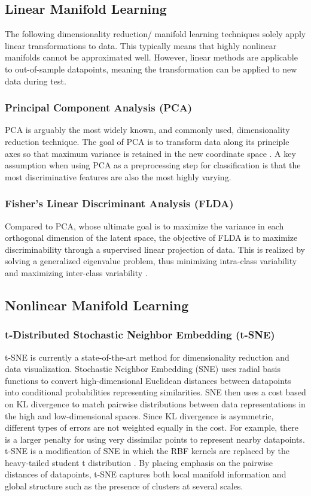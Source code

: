 \documentclass[conference]{IEEEtran}
\begin{document}
	\subsection{Linear Manifold Learning}
	The following dimensionality reduction/ manifold learning techniques solely apply linear transformations to data.  This typically means that highly nonlinear manifolds cannot be approximated well.  However, linear methods are applicable to out-of-sample datapoints, meaning the transformation can be applied to new data during test.
	\subsubsection*{Principal Component Analysis (PCA)}  PCA is arguably the most widely known, and commonly used, dimensionality reduction technique.  The goal of PCA is to transform data along its principle axes so that maximum variance is retained in the new coordinate space \cite{Tipping1999PPCA,Murphy2012Textbook}.  A key assumption when using PCA as a preprocessing step for classification is that the most discriminative features are also the most highly varying.
	\subsubsection*{Fisher's Linear Discriminant Analysis (FLDA)}  Compared to PCA, whose ultimate goal is to maximize the variance in each orthogonal dimension of the latent space, the objective of FLDA is to maximize discriminability through a supervised linear projection of data.  This is realized by solving a generalized eigenvalue problem, thus minimizing intra-class variability and maximizing inter-class variability \cite{Murphy2012Textbook,Sugiyama2006FDASupDimRed}.
	
	
	\subsection{Nonlinear Manifold Learning}
	\subsubsection*{t-Distributed Stochastic Neighbor Embedding (t-SNE)} t-SNE is currently a state-of-the-art method for dimensionality reduction and data visualization. Stochastic Neighbor Embedding (SNE) uses radial basis functions  to convert high-dimensional Euclidean distances between datapoints into conditional probabilities representing similarities.  SNE then uses a cost based on KL divergence to match pairwise distributions between data representations in the high and low-dimensional spaces.  Since KL divergence is asymmetric, different types of errors are not weighted equally in the cost.  For example, there is a larger penalty for using very dissimilar points to represent nearby datapoints.  t-SNE is a modification of SNE in which the RBF kernels are replaced by the heavy-tailed student t distribution \cite{vanDerMaaten2008tSNE}.  By placing emphasis on the pairwise distances of datapoints, t-SNE captures both local manifold information and global structure such as the presence of clusters at several scales.
\end{document}
